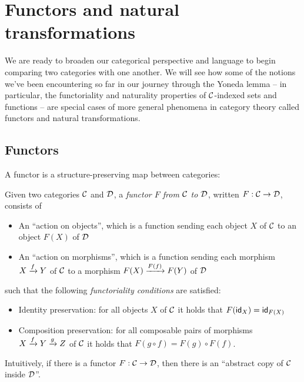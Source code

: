 \chapter{Functors and natural transformations}
We are ready to broaden our categorical perspective and language to begin 
comparing two categories with one another. We will see how some of the notions 
we've been encountering so far in our journey through the Yoneda 
lemma -- in particular, the functoriality and naturality properties of 
$\mathcal C$-indexed sets and functions -- are special cases of more general 
phenomena in category theory called functors and natural transformations.


\section{Functors}
A functor is a structure-preserving map between categories:

\begin{definition}[Functor]
  \sloppy
  Given two categories \(\mathcal C\) and \(\mathcal D\),
  a \emph{functor \(F\) from \(\mathcal C\) to \(\mathcal D\)},
  written
  \(F : \mathcal C \to \mathcal D\),
  consists of \begin{itemize}
    \item An ``action on objects'', which is a function sending each object \(X\) of \(\mathcal C\) to an object \(F(X)\) of \(\mathcal D\)
    \item An ``action on morphisms'', which is a function sending each morphism \(X \xrightarrow{f} Y\) of \(\mathcal C\) to a morphism \(F(X) \xrightarrow{F(f)} F(Y)\)
      of \(\mathcal D\)
  \end{itemize}
  such that the following \emph{functoriality conditions} are satisfied:
  \begin{itemize}
  \item Identity preservation: for all objects \(X\) of \(\mathcal C\) it holds that \(F(\mathsf{id}_X) = \mathsf{id}_{F(X)}\)
  \item Composition preservation: for all composable pairs of morphisms \(X \xrightarrow{f} Y \xrightarrow{g} Z\) of \(\mathcal C\)
    it holds that \(F(g \circ f) = F(g) \circ F(f)\).
  \end{itemize}
\end{definition}

Intuitively, if there is a functor $F : \mathcal C \to \mathcal D$, then 
there is an ``abstract copy of $\mathcal C$ inside $\mathcal D$''. 




